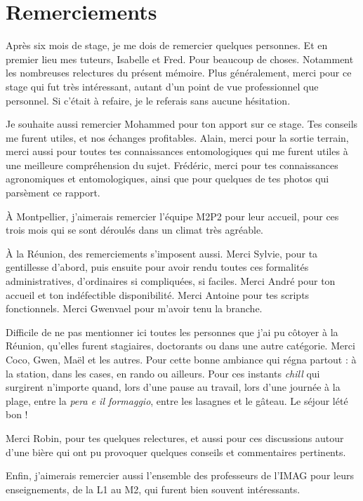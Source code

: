 \chapter*{Remerciements}
\thispagestyle{empty}

Après six mois de stage, je me dois de remercier quelques personnes.
Et en premier lieu mes tuteurs, Isabelle et Fred.
Pour beaucoup de choses.
Notamment les nombreuses relectures du présent mémoire.
Plus généralement, merci pour ce stage qui fut très intéressant, autant d'un point de vue professionnel que personnel.
Si c'était à refaire, je le referais sans aucune hésitation.

Je souhaite aussi remercier Mohammed pour ton apport sur ce stage.
Tes conseils me furent utiles, et nos échanges profitables.
Alain, merci pour la sortie terrain, merci aussi pour toutes tes connaissances entomologiques qui me furent utiles à une meilleure compréhension du sujet.
Frédéric, merci pour tes connaissances agronomiques et entomologiques, ainsi que pour quelques de tes photos qui parsèment ce rapport.

À Montpellier, j'aimerais remercier l'équipe M2P2 pour leur accueil, pour ces trois mois qui se sont déroulés dans un climat très agréable.

À la Réunion, des remerciements s'imposent aussi.
Merci Sylvie, pour ta gentillesse d'abord, puis ensuite pour avoir rendu toutes ces formalités administratives, d'ordinaires si compliquées, si faciles.
Merci André pour ton accueil et ton indéfectible disponibilité.
Merci Antoine pour tes scripts fonctionnels.
Merci Gwenvael pour m'avoir tenu la branche.

Difficile de ne pas mentionner ici toutes les personnes que j'ai pu côtoyer à la Réunion, qu'elles furent stagiaires, doctorants ou dans une autre catégorie. 
Merci Coco, Gwen, Maël et les autres.
Pour cette bonne ambiance qui régna partout : à la station, dans les cases, en rando ou ailleurs.
Pour ces instants \emph{chill} qui surgirent n'importe quand, lors d'une pause au travail, lors d'une journée à la plage, entre la \emph{pera e il formaggio}, entre les lasagnes et le gâteau.
Le séjour lété bon !

Merci Robin, pour tes quelques relectures, et aussi pour ces discussions autour d'une bière qui ont pu provoquer quelques conseils et commentaires pertinents.

Enfin, j'aimerais remercier aussi l'ensemble des professeurs de l'IMAG pour leurs enseignements, de la L1 au M2, qui furent bien souvent intéressants.

